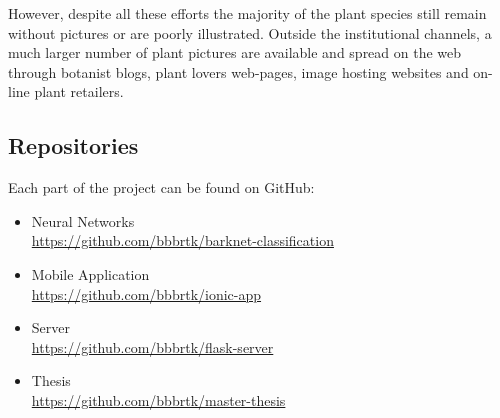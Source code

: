 \documentclass[../Main.tex]{subfiles}
\begin{document}
        However, despite all these efforts the majority of the plant species still remain without pictures or are poorly illustrated. Outside the institutional
channels, a much larger number of plant pictures are available and spread
on the web through botanist blogs, plant lovers web-pages, image hosting
websites and on-line plant retailers. 

\newpage
\subsection{Repositories}

    Each part of the project can be found on GitHub:

    \begin{itemize}
        \item{
        Neural Networks \cite{vgg} \\
        \url{https://github.com/bbbrtk/barknet-classification}
        }
        \item{ 
        Mobile Application \\
        \url{https://github.com/bbbrtk/ionic-app}
            }
        \item {
        Server \\
        \url{https://github.com/bbbrtk/flask-server}
            }
        \item {
        Thesis \\
        \url{https://github.com/bbbrtk/master-thesis}
        }
    \end{itemize}
\biblio %
\end{document}
